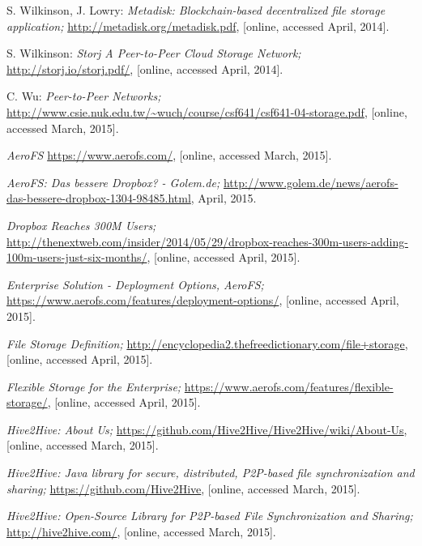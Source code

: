 \begin{thebibliography}{99}
		S. Wilkinson, J. Lowry:
		\emph{Metadisk: Blockchain-based decentralized file storage application;}
		\url{http://metadisk.org/metadisk.pdf},
		[online, accessed April, 2014].
		
		S. Wilkinson:
		\emph{Storj A Peer-to-Peer Cloud Storage Network;}
		\url{http://storj.io/storj.pdf/},
		[online, accessed April, 2014].

		C. Wu:
		\emph{Peer-to-Peer Networks;}
		\url{http://www.csie.nuk.edu.tw/~wuch/course/csf641/csf641-04-storage.pdf},
		[online, accessed March, 2015].

		\emph{AeroFS}
		\url{https://www.aerofs.com/},
		[online, accessed March, 2015].

		\emph{AeroFS: Das bessere Dropbox? - Golem.de;}
		\url{http://www.golem.de/news/aerofs-das-bessere-dropbox-1304-98485.html},
		April, 2015.

		\emph{Dropbox Reaches 300M Users;}
		\url{http://thenextweb.com/insider/2014/05/29/dropbox-reaches-300m-users-adding-100m-users-just-six-months/},
		[online, accessed April, 2015].

		\emph{Enterprise Solution - Deployment Options, AeroFS;}
		\url{https://www.aerofs.com/features/deployment-options/},
		[online, accessed April, 2015].

		\emph{File Storage Definition;}
		\url{http://encyclopedia2.thefreedictionary.com/file+storage},
		[online, accessed April, 2015].

		\emph{Flexible Storage for the Enterprise;}
		\url{https://www.aerofs.com/features/flexible-storage/},
		[online, accessed April, 2015].

		\emph{Hive2Hive: About Us;}
		\url{https://github.com/Hive2Hive/Hive2Hive/wiki/About-Us},
		[online, accessed March, 2015].

		\emph{Hive2Hive: Java library for secure, distributed, P2P-based file synchronization and sharing;}
		\url{https://github.com/Hive2Hive},
		[online, accessed March, 2015].

		\emph{Hive2Hive: Open-Source Library for P2P-based File Synchronization and Sharing;}
		\url{http://hive2hive.com/},
		[online, accessed March, 2015].


\end{thebibliography}

